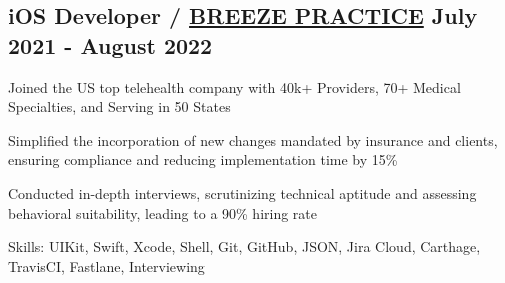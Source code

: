 \subsection{{iOS Developer / \href{https://www.carecloud.com/breeze/}{BREEZE PRACTICE} \hfill July 2021 - August 2022}}
\begin{zitemize}
\setlength\itemsep{0.5em}
\item Joined the US top telehealth company with 40k+ Providers, 70+ Medical Specialties, and Serving in 50 States

\item Simplified the incorporation of new changes mandated by insurance and clients, ensuring compliance and reducing implementation time by 15\%

\item Conducted in-depth interviews, scrutinizing technical aptitude and assessing behavioral suitability, leading to a 90\% hiring rate %


\item[] Skills: UIKit, Swift, Xcode, Shell, Git, GitHub, JSON, Jira Cloud, Carthage, TravisCI, Fastlane, Interviewing

\end{zitemize}

